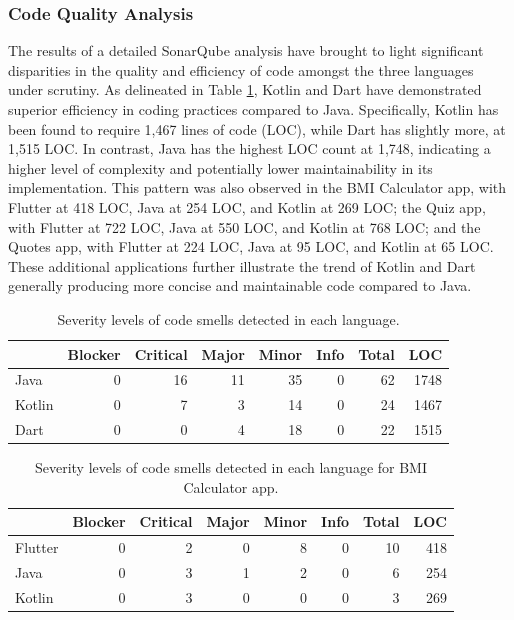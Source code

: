 \subsubsection{Code Quality Analysis}
The results of a detailed SonarQube analysis have brought to light significant disparities in the quality and efficiency of code amongst the three languages under scrutiny. As delineated in Table \ref*{tab:kanban}, Kotlin and Dart have demonstrated superior efficiency in coding practices compared to Java. Specifically, Kotlin has been found to require 1,467 lines of code (LOC), while Dart has slightly more, at 1,515 LOC. In contrast, Java has the highest LOC count at 1,748, indicating a higher level of complexity and potentially lower maintainability in its implementation. This pattern was also observed in the BMI Calculator app, with Flutter at 418 LOC, Java at 254 LOC, and Kotlin at 269 LOC; the Quiz app, with Flutter at 722 LOC, Java at 550 LOC, and Kotlin at 768 LOC; and the Quotes app, with Flutter at 224 LOC, Java at 95 LOC, and Kotlin at 65 LOC. These additional applications further illustrate the trend of Kotlin and Dart generally producing more concise and maintainable code compared to Java.

\begin{table}[htbp]
	\begin{tabular}{l|r|r|r|r|r|r|r}
		\hline
        \cellcolor{Gray} & \cellcolor{Gray}Blocker & \cellcolor{Gray} Critical & \cellcolor{Gray} Major& \cellcolor{Gray}Minor& \cellcolor{Gray}Info & \cellcolor{Gray}Total& \cellcolor{Gray}LOC\\
        \hline
        \cellcolor{Gray} Java    & 0 & 16 & 11 & 35 & 0 & 62 & 1748 \\
        \cellcolor{Gray}Kotlin  & 0 & 7 & 3 & 14 & 0 & 24 & 1467 \\
        \cellcolor{Gray}Dart & 0 & 0 & 4 & 18 & 0 & 22 & 1515 \\
    
    \end{tabular}
	\caption{Severity levels of code smells detected in each language. \label{tab:kanban}}
\end{table}
\begin{table}[htbp]
    \begin{tabular}{l|r|r|r|r|r|r|r}
        \hline
        \cellcolor{Gray} & \cellcolor{Gray}Blocker & \cellcolor{Gray}Critical & \cellcolor{Gray}Major & \cellcolor{Gray}Minor & \cellcolor{Gray}Info & \cellcolor{Gray}Total & \cellcolor{Gray}LOC \\
        \hline
        \cellcolor{Gray}Flutter & 0 & 2 & 0 & 8 & 0 & 10 & 418 \\
        \cellcolor{Gray}Java    & 0 & 3 & 1 & 2 & 0 & 6 & 254 \\
        \cellcolor{Gray}Kotlin  & 0 & 3 & 0 & 0 & 0 & 3 & 269 \\
    \end{tabular}
    \caption{Severity levels of code smells detected in each language for BMI Calculator app. \label{tab:bmi}}
\end{table}


